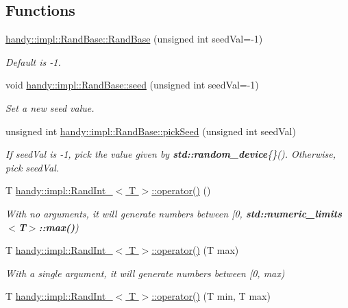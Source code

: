 \subsection*{Functions}
\begin{DoxyCompactItemize}
\item 
\hyperlink{group__RandomGroup_ga0ffb9e02dcdd71ed1fda48ca1e2f2fd5}{handy\+::impl\+::\+Rand\+Base\+::\+Rand\+Base} (unsigned int seed\+Val=-\/1)
\begin{DoxyCompactList}\small\item\em Default is \textquotesingle{}-\/1\textquotesingle{}. \end{DoxyCompactList}\item 
void \hyperlink{group__RandomGroup_ga3bb644a945c71368203459431818ddcd}{handy\+::impl\+::\+Rand\+Base\+::seed} (unsigned int seed\+Val=-\/1)
\begin{DoxyCompactList}\small\item\em Set a new seed value. \end{DoxyCompactList}\item 
unsigned int \hyperlink{group__RandomGroup_ga301c5bb729933e83eb5f071461169e9b}{handy\+::impl\+::\+Rand\+Base\+::pick\+Seed} (unsigned int seed\+Val)
\begin{DoxyCompactList}\small\item\em If {\ttfamily seed\+Val} is {\ttfamily -\/1}, pick the value given by {\bf std\+::random\+\_\+device}\{\}(). Otherwise, pick {\ttfamily seed\+Val}. \end{DoxyCompactList}\item 
T \hyperlink{group__RandomGroup_gaf1314be58129341263aadf0e74ef44da}{handy\+::impl\+::\+Rand\+Int\+\_\+$<$ T $>$\+::operator()} ()
\begin{DoxyCompactList}\small\item\em With no arguments, it will generate numbers between \mbox{[}0, {\bf std\+::numeric\+\_\+limits$<$\+T$>$\+::max()}) \end{DoxyCompactList}\item 
T \hyperlink{group__RandomGroup_gae6a2e95b745f7e9f9fadee0e9bab54f9}{handy\+::impl\+::\+Rand\+Int\+\_\+$<$ T $>$\+::operator()} (T max)
\begin{DoxyCompactList}\small\item\em With a single argument, it will generate numbers between \mbox{[}0, max) \end{DoxyCompactList}\item 
T \hyperlink{group__RandomGroup_gaae84dc62705bd77108f258555fa89925}{handy\+::impl\+::\+Rand\+Int\+\_\+$<$ T $>$\+::operator()} (T min, T max)

\end{DoxyCompactItemize}

